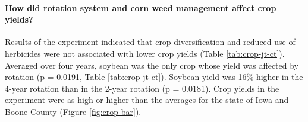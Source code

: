 \documentclass[
]{article}
\author{}
\date{\vspace{-2.5em}}
\begin{document}
\hypertarget{how-did-rotation-system-and-corn-weed-management-affect-crop-yields}{%
\paragraph*{How did rotation system and corn weed management affect crop yields?}\label{how-did-rotation-system-and-corn-weed-management-affect-crop-yields}}

Results of the experiment indicated that crop diversification and reduced use of herbicides were not associated with lower crop yields (Table \ref{tab:crop-jt-ct}). Averaged over four years, soybean was the only crop whose yield was affected by rotation (p = 0.0191, Table \ref{tab:crop-jt-ct}). Soybean yield was 16\% higher in the 4-year rotation than in the 2-year rotation (p = 0.0181). Crop yields in the experiment were as high or higher than the averages for the state of Iowa and Boone County (Figure \ref{fig:crop-bar}).
\end{document}
